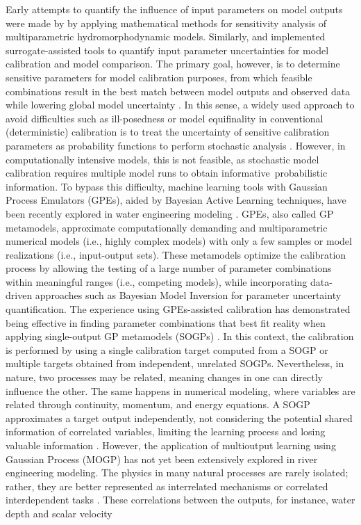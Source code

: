 \documentclass[draft,linenumbers,onecolumn]{agujournal2019} %
\begin{document}
Early attempts to quantify the influence of input parameters on model outputs were made by  by applying mathematical methods for sensitivity analysis of multiparametric hydromorphodynamic models. Similarly,  and  implemented surrogate-assisted tools to quantify input parameter uncertainties for model calibration and model comparison. The primary goal, however, is to determine sensitive parameters for model calibration purposes, from which feasible combinations result in the best match between model outputs and observed data while lowering global model uncertainty \cite{oberkampf2004verification}. In this sense, a widely used approach to avoid difficulties such as ill-posedness or model equifinality in conventional (deterministic) calibration is to treat the uncertainty of sensitive calibration parameters as probability functions to perform stochastic analysis \cite{kim2016stepwise}. However, in computationally intensive models, this is not feasible, as stochastic model calibration requires multiple model runs to obtain informative probabilistic information. To bypass this difficulty, machine learning tools with Gaussian Process Emulators (GPEs), aided by Bayesian Active Learning techniques, have been recently explored in water engineering modeling \cite{oladyshkin2020bayesian3}. GPEs, also called GP metamodels, approximate computationally demanding and multiparametric numerical models (i.e., highly complex models) with only a few samples or model realizations (i.e., input-output sets). These metamodels optimize the calibration process by allowing the testing of a large number of parameter combinations within meaningful ranges (i.e., competing models), while incorporating data-driven approaches such as Bayesian Model Inversion \cite{mohammadi2018bayesian} for parameter uncertainty quantification. The experience using GPEs-assisted calibration has demonstrated being effective in finding parameter combinations that best fit reality when applying single-output GP metamodels (SOGPs) \cite{schwindt2023bayesian, mouris2023stability}. In this context, the calibration is performed by using a single calibration target computed from a SOGP or multiple targets obtained from independent, unrelated SOGPs. Nevertheless, in nature, two processes may be related, meaning changes in one can directly influence the other. The same happens in numerical modeling, where variables are related through continuity, momentum, and energy equations. A SOGP approximates a target output independently, not considering the potential shared information of correlated variables, limiting the learning process and losing valuable information \cite{lin2021multioutput}. However, the application of multioutput learning using Gaussian Process (MOGP) has not yet been extensively explored in river engineering modeling. The physics in many natural processes are rarely isolated; rather, they are better represented as interrelated mechanisms or correlated interdependent tasks \cite{bonilla2007multitask}. These correlations between the outputs, for instance, water depth and scalar velocity 
\end{document}
